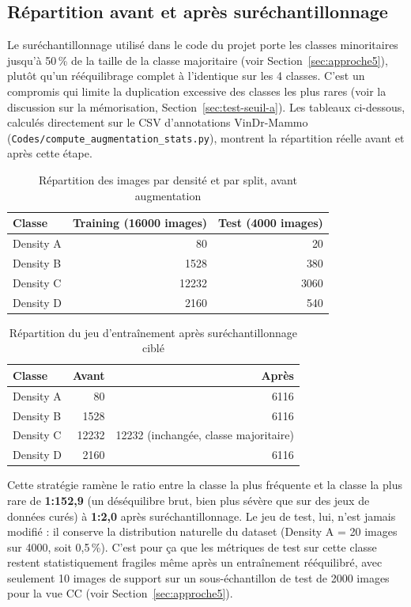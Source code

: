 \documentclass[12pt,a4paper]{report}
\begin{document}
\subsection{Répartition avant et après suréchantillonnage}

Le suréchantillonnage utilisé dans le code du projet porte les classes
minoritaires jusqu'à 50\,\% de la taille de la classe majoritaire (voir
Section~\ref{sec:approche5}), plutôt qu'un rééquilibrage complet à
l'identique sur les 4 classes. C'est un compromis qui limite la duplication
excessive des classes les plus rares (voir la discussion sur la
mémorisation, Section~\ref{sec:test-seuil-a}). Les tableaux ci-dessous,
calculés directement sur le CSV d'annotations VinDr-Mammo
(\texttt{Codes/compute\_augmentation\_stats.py}), montrent la répartition
réelle avant et après cette étape.

\begin{table}[h]
\centering
\caption{Répartition des images par densité et par split, avant augmentation}
\begin{tabular}{lrr}
\toprule
Classe & Training (16000 images) & Test (4000 images) \\
\midrule
Density A & 80 & 20 \\
Density B & 1528 & 380 \\
Density C & 12232 & 3060 \\
Density D & 2160 & 540 \\
\bottomrule
\end{tabular}
\end{table}

\begin{table}[h]
\centering
\caption{Répartition du jeu d'entraînement après suréchantillonnage ciblé}
\begin{tabular}{lrr}
\toprule
Classe & Avant & Après \\
\midrule
Density A & 80 & 6116 \\
Density B & 1528 & 6116 \\
Density C & 12232 & 12232 (inchangée, classe majoritaire) \\
Density D & 2160 & 6116 \\
\bottomrule
\end{tabular}
\end{table}

Cette stratégie ramène le ratio entre la classe la plus fréquente et la
classe la plus rare de \textbf{1:152,9} (un déséquilibre brut, bien plus
sévère que sur des jeux de données curés) à \textbf{1:2,0} après
suréchantillonnage. Le jeu de test, lui, n'est jamais modifié : il conserve
la distribution naturelle du dataset (Density A = 20 images sur 4000, soit
0,5\,\%). C'est pour ça que les métriques de test sur cette classe restent
statistiquement fragiles même après un entraînement rééquilibré, avec
seulement 10 images de support sur un sous-échantillon de test de 2000
images pour la vue CC (voir Section~\ref{sec:approche5}).
\end{document}
